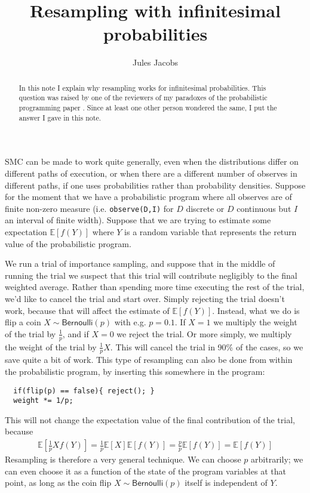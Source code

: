 \documentclass[a4paper, 11pt]{article}
\title{Resampling with infinitesimal probabilities}
\author{Jules Jacobs}
\theoremstyle{definition}
\begin{document}
\maketitle

\begin{abstract}
  In this note I explain why resampling works for infinitesimal probabilities. This question was raised by one of the reviewers of my paradoxes of the probabilistic programming paper \cite{jacobs_paradoxes_2021}. Since at least one other person wondered the same, I put the answer I gave in this note.
\end{abstract}

\newcommand{\Bernoulli}{\mathsf{Bernoulli}}
\newcommand{\E}{\mathbb{E}}

SMC can be made to work quite generally, even when the distributions differ on different paths of execution, or when there are a different number of observes in different paths, if one uses probabilities rather than probability densities. Suppose for the moment that we have a probabilistic program where all observes are of finite non-zero measure (i.e. \lstinline|observe(D,I)| for $D$ discrete or $D$ continuous but $I$ an interval of finite width). Suppose that we are trying to estimate some expectation $\E[f(Y)]$ where $Y$ is a random variable that represents the return value of the probabilistic program.

We run a trial of importance sampling, and suppose that in the middle of running the trial we suspect that this trial will contribute negligibly to the final weighted average. Rather than spending more time executing the rest of the trial, we'd like to cancel the trial and start over. Simply rejecting the trial doesn't work, because that will affect the estimate of $\E[f(Y)]$. Instead, what we do is flip a coin $X \sim \Bernoulli(p)$ with e.g. $p = 0.1$. If $X = 1$ we multiply the weight of the trial by $\frac{1}{p}$, and if $X = 0$ we reject the trial. Or more simply, we multiply the weight of the trial by $\frac{1}{p}X$. This will cancel the trial in 90\% of the cases, so we save quite a bit of work. This type of resampling can also be done from within the probabilistic program, by inserting this somewhere in the program:

\begin{lstlisting}
  if(flip(p) == false){ reject(); }
  weight *= 1/p;
\end{lstlisting}

This will not change the expectation value of the final contribution of the trial, because
\begin{align*}
  \E[\frac{1}{p} X f(Y)] = \frac{1}{p} \E[X] \E[f(Y)] = \frac{p}{p} \E[f(Y)] = \E[f(Y)]
\end{align*}
Resampling is therefore a very general technique. We can choose $p$ arbitrarily; we can even choose it as a function of the state of the program variables at that point, as long as the coin flip $X \sim \Bernoulli(p)$ itself is independent of $Y$.
\end{document}
